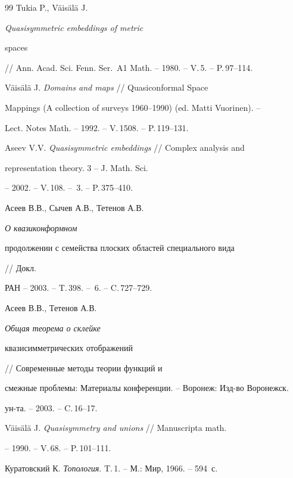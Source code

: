 \begin{thebibliography}{99}
Tukia P., V\"ais\"al\"a J. {\em Quasisymmetric embeddings of metric 


spaces} // Ann. Acad. Sci. Fenn. Ser.~A1 Math. -- 1980. -- V.\,5. -- P.\,97--114. 




V\"ais\"al\"a J. {\em Domains and maps} // Quasiconformal Space 


Mappings (A collection of surveys 1960--1990) (ed. Matti Vuorinen). --


Lect. Notes Math. -- 1992. -- V.\,1508. -- P.\,119--131.




Aseev V.V. {\em Quasisymmetric embeddings} // Complex analysis and 


representation theory. 3 -- J. Math. Sci. %


-- 2002. -- V.\,108. -- \No\,3. -- P.\,375--410. 




Асеев В.В., Сычев А.В., Тетенов А.В. {\em О квазиконформном 


продолжении с семейства плоских областей специального вида} // Докл.


РАН -- 2003. -- T.\,398. -- \No\,6. -- C.\,727--729.




Асеев В.В., Тетенов А.В. {\em Общая теорема о склейке 


квазисимметрических отображений} // Современные методы теории функций и 


смежные проблемы: Материалы конференции. -- Воронеж: Изд-во Воронежск. 


ун-та. -- 2003. -- C.\,16--17.




V\"ais\"al\"a J. {\em Quasisymmetry and unions} // Manuscripta math.


-- 1990. -- V.\,68. -- P.\,101--111.




Куратовский К. {\em Топология}. T.\,1. -- М.: Мир, 1966. -- 594~с.





\end{thebibliography}





\vskip 2cm











\smallskip









\label{end}








